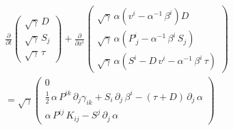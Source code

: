 \documentclass[10pt]{article}
\begin{document}
\begin{align*}\frac{\partial}{\partial t}\begin{pmatrix}\sqrt{\gamma}\,D\\\sqrt{\gamma}\,S_{j}\\\sqrt{\gamma}\,\tau\end{pmatrix}+\frac{\partial}{\partial x^{i}}\begin{pmatrix}\sqrt{\gamma}\,\alpha\left(v^{i}-\alpha^{-1}\,\beta^{i}\right)D\\\sqrt{\gamma}\,\alpha\left(P^{i}_{~j}-\alpha^{-1}\,\beta^{i}\,S_{j}\right)\\\sqrt{\gamma}\,\alpha\left(S^{i}-D\,v^{i}-\alpha^{-1}\,\beta^{i}\,\tau\right)\end{pmatrix}\\=\sqrt{\gamma}\begin{pmatrix}0\\\frac{1}{2}\,\alpha\,P^{ik}\,\partial_{j}\gamma_{ik}+S_{i}\,\partial_{j}\,\beta^{i}-\left(\tau+D\right)\,\partial_{j}\,\alpha\\\alpha\,P^{ij}\,K_{ij}-S^{j}\,\partial_{j}\,\alpha\end{pmatrix}
\end{align*}
\end{document}

